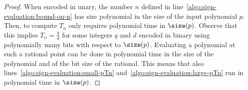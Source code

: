 \LemmaRuntimeSignPolyRootBarrier* 

\begin{proof}
  When encoded in unary, the number $n$ defined in
  line~\ref{algo:sign-evaluation:bound-on-n} has size polynomial in the size of
  the input polynomial $p$. Then, to compute $T_n$ only requires polynomial time
  in $\size(p)$. Observe that this implies $T_n = \frac{q}{d}$ for some integers
  $q$ and $d$ encoded in binary using polynomially many bits with respect to $\size(p)$. Evaluating a
  polynomial at such a rational point can be done in polynomial time in the size of
  the polynomial and of the bit size of the rational. 
  This means that also lines~\ref{algo:sign-evaluation:small-pTn}
  and~\ref{algo:sign-evaluation:large-pTn} run in polynomial time in $\size(p)$.
\end{proof}

\LemmaCorrectnessAlgorithmOne* 

